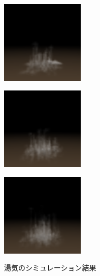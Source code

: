 \begin{figure}[htbp]
 \begin{minipage}{0.33\hsize}
  \begin{center}
   \includegraphics[width=40mm]{img/render_80.bmp}
  \end{center}
  \label{fig:seven}
 \end{minipage}
 \begin{minipage}{0.33\hsize}
 \begin{center}
  \includegraphics[width=40mm]{img/render_90.bmp}
 \end{center}
  \label{fig:eight}
 \end{minipage}
 \begin{minipage}{0.33\hsize}
 \begin{center}
  \includegraphics[width=40mm]{img/render_100.bmp}
 \end{center}
  \label{fig:nine}
 \end{minipage}
 \caption{湯気のシミュレーション結果}
 \label{result}
\end{figure}